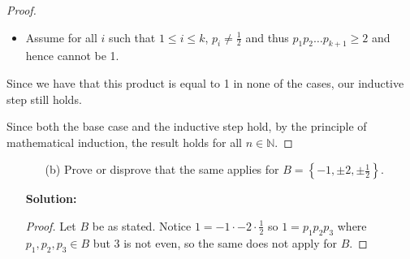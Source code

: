 \documentclass[letterpaper,12pt]{article}
\newcommand{\set}[1]{\left\{ #1 \right\}}
\theoremstyle{definition}
\begin{document}
\begin{enumerate}
\begin{mdframed}
\begin{proof}
\begin{itemize}
\begin{itemize}
\begin{itemize}
\begin{itemize}
                         \item Assume for all $i$ such that $1 \leq i \leq k$, $p_i \neq \frac{1}{2}$ and thus  $p_1p_2 \ldots p_{k+1} \geq 2$ and hence cannot be 1.
                     \end{itemize}
                 \end{itemize}
                Since we have that this product is equal to 1 in none of the cases, our inductive step still holds.
             \end{itemize}
         \end{itemize}
         Since both the base case and the inductive step hold, by the principle of mathematical induction, the result holds for all $n \in \mathbb{N}$.
     \end{proof}
 \end{mdframed}
\end{enumerate}
\pagebreak
\begin{enumerate}
    \item[] \begin{enumerate}
        \item[(b)] Prove or disprove that the same applies for $B = \set{-1, \pm 2, \pm \frac{1}{2}}$.
    \end{enumerate}
    \begin{mdframed}
        \textbf{Solution:}
        \renewcommand{\proofname}{Disproof}
        \begin{proof}
            Let $B$ be as stated. Notice $1 = -1 \cdot -2 \cdot \frac{1}{2}$ so $1 = p_1p_2p_3$ where $p_1,p_2,p_3 \in B$ but $3$ is not even, so the same does not apply for $B$.
        \end{proof}
    \end{mdframed}
\end{enumerate}
\pagebreak
\end{document}
